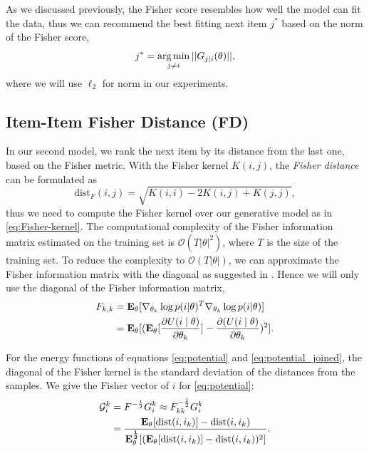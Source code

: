 As we discussed previously, the Fisher score resembles how well the model can fit the data, thus we can recommend the best fitting next item $j^{*}$ based on the norm of the Fisher score,
%
\begin{equation}
j^{*} = \operatorname*{arg\,min}_{j \neq i} || G_{j|i}(\theta) ||,
\nonumber
\end{equation}
%
where we will use $\ell_2$ for norm in our experiments.

\subsection{Item-Item Fisher Distance (FD)}
\label{sect:FD}

In our second model, we rank the next item by its distance from the last one, based on the Fisher metric. With the Fisher kernel $K(i,j)$, the \emph{Fisher distance} can be formulated as
\begin{equation}
\mbox{dist}_F(i,j) = \sqrt{K(i,i) - 2 K(i,j) + K(j,j)},
\label{eq:Fisher-dist}
\end{equation}   
%
thus we need to compute the Fisher kernel over our generative model as in \eqref{eq:Fisher-kernel}.  The computational complexity of the Fisher information matrix estimated on the training set is $\mathcal{O}(T |\theta|^2)$, where $T$ is the size of the training set.  To reduce the complexity to $\mathcal{O}(T |\theta|)$, we can approximate the Fisher information matrix with the diagonal as suggested in \cite{JH,perronnin2007fisher}.
Hence we will only use the diagonal of the Fisher information matrix, 
%
\begin{equation}
\begin{split}
    F_{k,k} &={\bf E_{\theta}}[\nabla_{\theta_k} \log p(i|\theta)^T \nabla_{\theta_k} \log p(i|\theta)] \\
    &={\bf E_{\theta}}[({\bf E_{\theta}}[\frac{\partial{U(i \mid \theta)}}{\partial{\theta_k}}] - \frac{\partial{(U(i \mid \theta)}}{\partial{\theta_k}})^2] . \\
\end{split}
\nonumber
\end{equation}

For the energy functions of equations \eqref{eq:potential} and \eqref{eq:potential_joined}, the diagonal of the Fisher kernel is the standard deviation of the distances from the samples. We give the Fisher vector of $i$ for 
\eqref{eq:potential}:
%
\begin{equation}
\begin{split}    
    \mathcal{G}_i^k &= F^{-\frac 12} G_i^k \approx F_{kk}^{-\frac 12} G_i^k\\
    &=\frac {{\bf E_{\theta}}[\mbox{dist}(i,i_k)] - \mbox{dist}(i,i_k)} {{\bf E_{\theta}^{\frac 12}}[({\bf E_{\theta}}[\mbox{dist}(i,i_k)] - \mbox{dist}(i,i_k))^2]}.
    \nonumber
\end{split}
\label{eq:kernel}
\end{equation}

